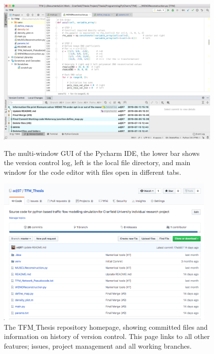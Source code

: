 	\begin{figure}
        		\begin{minipage}{0.48\textwidth}
            		\centering
            		\includegraphics[trim=0 0 0 0,clip,width=\textwidth]{PyCharm.png}
            		\caption[Development : PyCharm IDE]{The multi-window GUI of the Pycharm IDE, the lower bar shows the version control log, left is the local file directory, and main window for the code editor with files open in different tabs.}
            		\label{fig:dev:pycharm}
        		\end{minipage}
        		\hfill
        		\begin{minipage}{0.48\textwidth}
            		\centering
            		\includegraphics[trim=0 0 0 0,clip,width=0.97\textwidth]{GitHub.png}
            		\caption[Development : GitHub version control]{The TFM$\_$Thesis repository homepage, showing committed files and information on history of version control. This page links to all other features; issues, project management and all working branches.}
            		\label{fig:dev:github}
        		\end{minipage}
	\end{figure}

